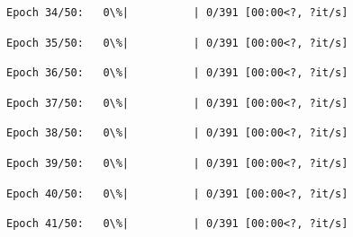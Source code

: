 \documentclass[11pt]{article}
\begin{document}
    
    
    \begin{Verbatim}[commandchars=\\\{\}]
Epoch 34/50:   0\%|          | 0/391 [00:00<?, ?it/s]
    \end{Verbatim}

    
    
    \begin{Verbatim}[commandchars=\\\{\}]
Epoch 35/50:   0\%|          | 0/391 [00:00<?, ?it/s]
    \end{Verbatim}

    
    
    \begin{Verbatim}[commandchars=\\\{\}]
Epoch 36/50:   0\%|          | 0/391 [00:00<?, ?it/s]
    \end{Verbatim}

    
    
    \begin{Verbatim}[commandchars=\\\{\}]
Epoch 37/50:   0\%|          | 0/391 [00:00<?, ?it/s]
    \end{Verbatim}

    
    
    \begin{Verbatim}[commandchars=\\\{\}]
Epoch 38/50:   0\%|          | 0/391 [00:00<?, ?it/s]
    \end{Verbatim}

    
    
    \begin{Verbatim}[commandchars=\\\{\}]
Epoch 39/50:   0\%|          | 0/391 [00:00<?, ?it/s]
    \end{Verbatim}

    
    
    \begin{Verbatim}[commandchars=\\\{\}]
Epoch 40/50:   0\%|          | 0/391 [00:00<?, ?it/s]
    \end{Verbatim}

    
    
    \begin{Verbatim}[commandchars=\\\{\}]
Epoch 41/50:   0\%|          | 0/391 [00:00<?, ?it/s]
    \end{Verbatim}
\end{document}
